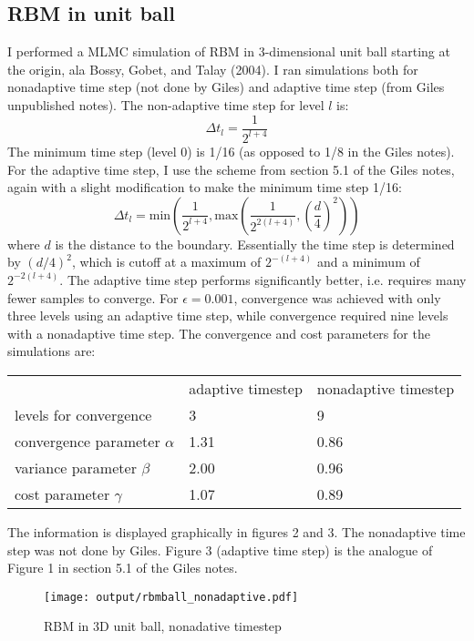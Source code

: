\documentclass[]{article}
\theoremstyle{definition}
\theoremstyle{remark}
\begin{document}
\subsection{RBM in unit ball}I performed a MLMC simulation of RBM in 3-dimensional unit ball starting at the origin, ala Bossy, Gobet, and Talay (2004). I ran simulations both for nonadaptive time step (not done by Giles) and adaptive time step (from Giles unpublished notes). The non-adaptive time step for level $l$ is:
\[
\Delta t_l = \frac{1}{2^{l+4}}
\]
The minimum time step (level 0) is 1/16 (as opposed to 1/8 in the Giles notes). For the adaptive time step, I use the scheme from section 5.1 of the Giles notes, again with a slight modification to make the minimum time step 1/16:
\[
\Delta t_l = \textrm{min} \left( \frac{1}{2^{l+4}}, \textrm{max} \left( \frac{1}{2^{2(l+4)}}, \left( \frac{d}{4}\right)^2\right) \right)
\] 
where $d$ is the distance to the boundary. Essentially the time step is determined by $(d/4)^2$, which is cutoff at a maximum of $2^{-(l+4)}$ and a minimum of $2^{-2(l+4)}$. The adaptive time step performs significantly better, i.e. requires many fewer samples to converge. For $\epsilon = 0.001$, convergence was achieved with only three levels using an adaptive time step, while convergence required nine levels with a nonadaptive time step. The convergence and cost parameters for the simulations are:
\begin{table}[H]
\centering
\label{my-label}
\begin{tabular}{lll}
                                            & adaptive timestep & nonadaptive timestep \\ \cline{2-3} 
\multicolumn{1}{l|}{levels for convergence} & 3                 & 9                    \\
\multicolumn{1}{l|}{convergence parameter $\alpha$}               & 1.31              & 0.86                 \\
\multicolumn{1}{l|}{variance parameter $\beta$}                & 2.00              & 0.96                 \\
\multicolumn{1}{l|}{cost parameter $\gamma$}               & 1.07              & 0.89                
\end{tabular}
\end{table}
The information is displayed graphically in figures 2 and 3. The nonadaptive time step was not done by Giles. Figure 3 (adaptive time step) is the analogue of Figure 1 in section 5.1 of the Giles notes.

\begin{figure}[ht!]
\centering
\texttt{[image: output/rbmball\_nonadaptive.pdf]}
\caption{RBM in 3D unit ball, nonadative timestep}
\end{figure}
\end{document}
